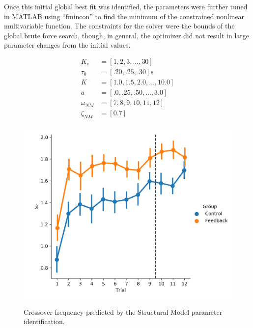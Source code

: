 Once this initial global best fit was identified, the parameters were further tuned in MATLAB using ``fmincon'' to find the minimum of the constrained nonlinear multivariable function.
The constraints for the solver were the bounds of the global brute force search, though, in general, the optimizer did not result in large parameter changes from the initial values.

\begin{align}
    K_e    & = [1, 2, 3, \ldots, 30]             \\
    \tau_0 & = [.20, .25, .30] s \\
    K      & = [1.0, 1.5, 2.0, \ldots, 10.0]     \\
    a      & = [.0, .25, .50, \ldots, 3.0] \\
    \omega_{NM} & = [7, 8, 9, 10, 11, 12] \\
    \zeta_{NM} & = [0.7] \\
\end{align}

\begin{figure}[t]
    \centering
    \centering
    \includegraphics[width=0.8\linewidth]{figures/Modeling/wc_group.png}
    \label{fig:sm_crossover}
    \caption[Crossover frequency (Structural Model)]{Crossover frequency predicted by the Structural Model parameter identification.}
\end{figure}

